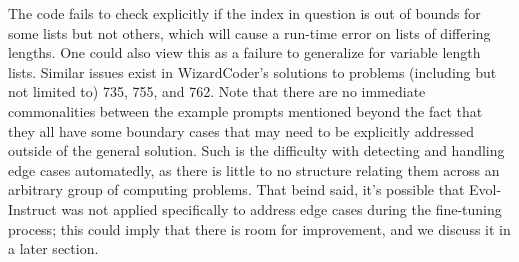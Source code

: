 \documentclass[10pt]{article}
\theoremstyle{definition}
\begin{document}
\noindent The code fails to check explicitly if the index in question is out of bounds for some lists but not others, which will cause a run-time error on lists of differing lengths. One could also view this as a failure to generalize for variable length lists. Similar issues exist in WizardCoder's solutions to problems (including but not limited to) 735, 755, and 762. Note that there are no immediate commonalities between the example prompts mentioned beyond the fact that they all have some boundary cases that may need to be explicitly addressed outside of the general solution. Such is the difficulty with detecting and handling edge cases automatedly, as there is little to no structure relating them across an arbitrary group of computing problems. That beind said, it's possible that Evol-Instruct was not applied specifically to address edge cases during the fine-tuning process; this could imply that there is room for improvement, and we discuss it in a later section.\\
\end{document}
